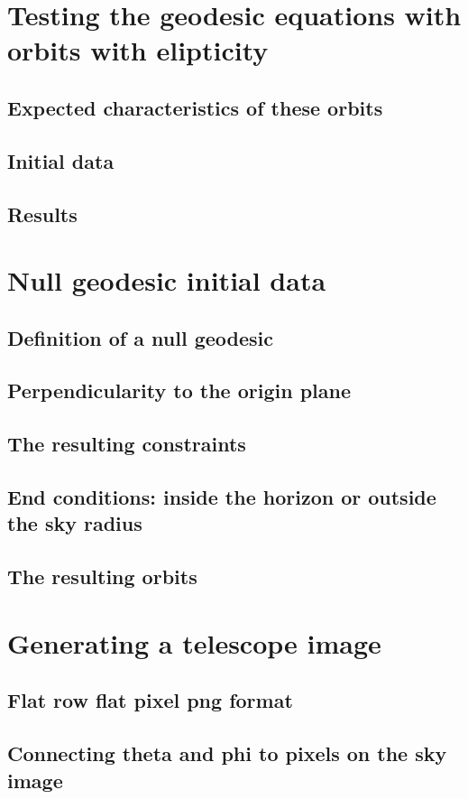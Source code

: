 \documentclass{article}
\begin{document}
\section{Testing the geodesic equations with orbits with elipticity}
\subsection{Expected characteristics of these orbits}
\subsection{Initial data}
\subsection{Results}

\section{Null geodesic initial data}
\subsection{Definition of a null geodesic}
\subsection{Perpendicularity to the origin plane}
\subsection{The resulting constraints}
\subsection{End conditions: inside the horizon or outside the sky radius}
\subsection{The resulting orbits} %

\section{Generating a telescope image}
\subsection{Flat row flat pixel png format}
\subsection{Connecting theta and phi to pixels on the sky image}
\end{document}

